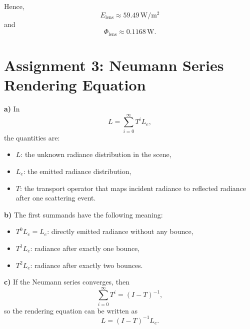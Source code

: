 \documentclass[a4paper,11pt]{article}
\begin{document}
Hence,
\[
\boxed{E_{\text{lens}} \approx 59.49\,\si{\watt\per\square\meter}}
\]
and
\[
\boxed{\Phi_{\text{lens}} \approx 0.1168\,\si{\watt}.}
\]

\section*{Assignment 3: Neumann Series Rendering Equation}
\textbf{a)} In
\[
L = \sum_{i=0}^{\infty} T^i L_e,
\]
the quantities are:
\begin{itemize}
    \item $L$: the unknown radiance distribution in the scene,
    \item $L_e$: the emitted radiance distribution,
    \item $T$: the transport operator that maps incident radiance to reflected radiance after one scattering event.
\end{itemize}

\textbf{b)} The first summands have the following meaning:
\begin{itemize}
    \item $T^0 L_e = L_e$: directly emitted radiance without any bounce,
    \item $T^1 L_e$: radiance after exactly one bounce,
    \item $T^2 L_e$: radiance after exactly two bounces.
\end{itemize}

\textbf{c)} If the Neumann series converges, then
\[
\sum_{i=0}^{\infty} T^i = (I-T)^{-1},
\]
so the rendering equation can be written as
\[
\boxed{L = (I-T)^{-1} L_e.}
\]
\end{document}
